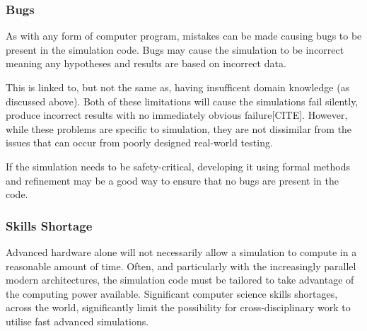 \documentclass{UoYCSproject}
\begin{document}
\subsubsection{Bugs}
As with any form of computer program, mistakes can be made causing bugs to be present in the simulation code. Bugs may cause the simulation to be incorrect meaning any hypotheses and results are based on incorrect data.

This is linked to, but not the same as, having insufficent domain knowledge (as discussed above). Both of these limitations will cause the simulations fail silently, produce incorrect results with no immediately obvious failure[CITE]. However, while these problems are specific to simulation, they are not dissimilar from the issues that can occur from poorly designed real-world testing. %

If the simulation needs to be safety-critical, developing it using formal methods and refinement may be a good way to ensure that no bugs are present in the code.

\subsubsection{Skills Shortage}
\label{skills_shortage}
Advanced hardware alone will not necessarily allow a simulation to compute in a reasonable amount of time. Often, and particularly with the increasingly parallel modern architectures, the simulation code must be tailored to take advantage of the computing power available. Significant computer science skills shortages, across the world, significantly limit the possibility for cross-disciplinary work to utilise fast advanced simulations.


\end{document}
